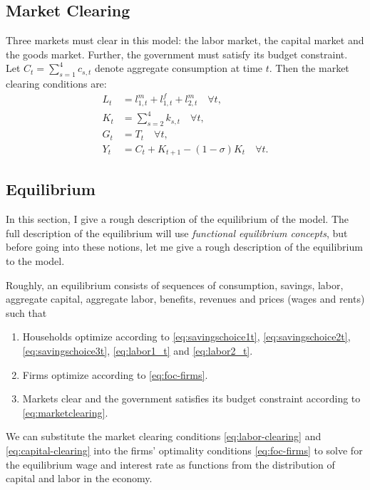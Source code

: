 \documentclass[ProjectUYA]{subfiles}
\begin{document}
\subsection{Market Clearing}

Three markets must clear in this model: the labor market, the capital market and the goods market. Further, the government must satisfy its budget constraint. Let $C_t=\sum_{s=1}^4 c_{s,t}$ denote aggregate consumption at time $t.$
Then the market clearing conditions are:
\begin{subequations}
	\label{eq:marketclearing}
	\begin{align}
		L_t&=l_{1,t}^m+l_{1,t}^f + l_{2,t}^m\quad \forall t,\label{eq:labor-clearing}\\
		K_t&=\sum_{s=2}^4 k_{s,t}\quad \forall t, \label{eq:capital-clearing}\\
		G_t&=T_t\quad \forall t,\label{eq:govbudget}\\
		Y_t&=C_t + K_{t+1}-(1-\sigma)K_t \quad \forall t. \label{eq:goods-clearing}
	\end{align}
\end{subequations}


\subsection{Equilibrium}

In this section, I give a rough description of the equilibrium of the model. The full description of the equilibrium will use \emph{functional equilibrium concepts}, but before going into these notions, let me give a rough description of the equilibrium to the model. 

Roughly, an equilibrium consists of sequences of consumption, savings, labor, aggregate capital, aggregate labor, benefits, revenues and prices (wages and rents) such that
\begin{enumerate}
	\item Households optimize according to \eqref{eq:savingschoice1t}, \eqref{eq:savingschoice2t},
	 \eqref{eq:savingschoice3t}, \eqref{eq:labor1_t} and \eqref{eq:labor2_t}.
	\item Firms optimize according to \eqref{eq:foc-firms}.
	\item Markets clear and the government satisfies its budget constraint according to \eqref{eq:marketclearing}.
\end{enumerate}

We can substitute the market clearing conditions \eqref{eq:labor-clearing} and \eqref{eq:capital-clearing}  into the firms' optimality conditions \eqref{eq:foc-firms} to solve for the equilibrium wage and interest rate 
as functions from the distribution of capital and labor in the economy.
\end{document}
